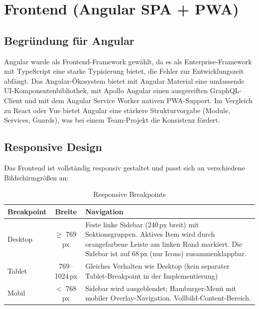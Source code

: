 \documentclass[12pt,a4paper,ngerman]{article}
\begin{document}
\section{Frontend (Angular SPA + PWA)}

\subsection{Begründung für Angular}

Angular wurde als Frontend-Framework gewählt, da es als Enterprise-Framework mit TypeScript eine starke Typisierung bietet, die Fehler zur Entwicklungszeit abfängt. Das Angular-Ökosystem bietet mit Angular Material eine umfassende UI-Komponentenbibliothek, mit Apollo Angular einen ausgereiften GraphQL-Client und mit dem Angular Service Worker nativen PWA-Support. Im Vergleich zu React oder Vue bietet Angular eine stärkere Strukturvorgabe (Module, Services, Guards), was bei einem Team-Projekt die Konsistenz fördert.

\subsection{Responsive Design}

Das Frontend ist vollständig responsiv gestaltet und passt sich an verschiedene Bildschirmgrößen an:

\begin{table}[H]
\centering
\caption{Responsive Breakpoints}
\begin{tabular}{lcL{6cm}}
\toprule
\textbf{Breakpoint} & \textbf{Breite} & \textbf{Navigation} \\
\midrule
Desktop  & $\geq$ 769\,px    & Feste linke Sidebar (240\,px breit) mit Sektionsgruppen. Aktives Item wird durch orangefarbene Leiste am linken Rand markiert. Die Sidebar ist auf 68\,px (nur Icons) zusammenklappbar. \\
Tablet   & 769--1024\,px     & Gleiches Verhalten wie Desktop (kein separater Tablet-Breakpoint in der Implementierung) \\
Mobil    & $<$ 768\,px       & Sidebar wird ausgeblendet; Hamburger-Menü mit mobiler Overlay-Navigation. Vollbild-Content-Bereich. \\
\bottomrule
\end{tabular}
\end{table}
\end{document}
